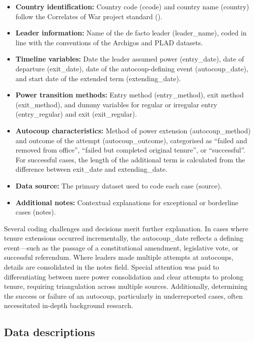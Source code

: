 \documentclass[
  12pt,
]{report}
\begin{document}
\begin{itemize}
\item
  \textbf{Country identification:} Country code (ccode) and country name
  (country) follow the Correlates of War project standard
  ().
\item
  \textbf{Leader information:} Name of the de facto leader
  (leader\_name), coded in line with the conventions of the Archigos and
  PLAD datasets.
\item
  \textbf{Timeline variables:} Date the leader assumed power
  (entry\_date), date of departure (exit\_date), date of the
  autocoup-defining event (autocoup\_date), and start date of the
  extended term (extending\_date).
\item
  \textbf{Power transition methods:} Entry method (entry\_method), exit
  method (exit\_method), and dummy variables for regular or irregular
  entry (entry\_regular) and exit (exit\_regular).
\item
  \textbf{Autocoup characteristics:} Method of power extension
  (autocoup\_method) and outcome of the attempt (autocoup\_outcome),
  categorised as ``failed and removed from office'', ``failed but
  completed original tenure'', or ``successful''. For successful cases,
  the length of the additional term is calculated from the difference
  between exit\_date and extending\_date.
\item
  \textbf{Data source:} The primary dataset used to code each case
  (source).
\item
  \textbf{Additional notes:} Contextual explanations for exceptional or
  borderline cases (notes).
\end{itemize}

Several coding challenges and decisions merit further explanation. In
cases where tenure extensions occurred incrementally, the autocoup\_date
reflects a defining event---such as the passage of a constitutional
amendment, legislative vote, or successful referendum. Where leaders
made multiple attempts at autocoups, details are consolidated in the
notes field. Special attention was paid to differentiating between mere
power consolidation and clear attempts to prolong tenure, requiring
triangulation across multiple sources. Additionally, determining the
success or failure of an autocoup, particularly in underreported cases,
often necessitated in-depth background research.

\subsection*{Data descriptions}\label{data-descriptions}
\end{document}
